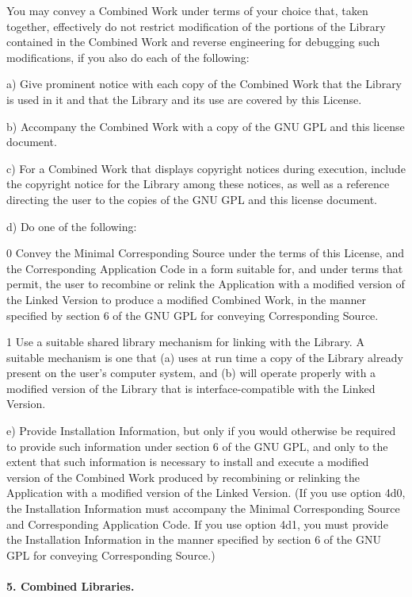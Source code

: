 You may convey a Combined Work under terms of your choice that, taken together, effectively do not restrict modification of the portions of the Library contained in the Combined Work and reverse engineering for debugging such modifications, if you also do each of the following\-:

a) Give prominent notice with each copy of the Combined Work that the Library is used in it and that the Library and its use are covered by this License.

b) Accompany the Combined Work with a copy of the G\-N\-U G\-P\-L and this license document.

c) For a Combined Work that displays copyright notices during execution, include the copyright notice for the Library among these notices, as well as a reference directing the user to the copies of the G\-N\-U G\-P\-L and this license document.

d) Do one of the following\-:

0 Convey the Minimal Corresponding Source under the terms of this License, and the Corresponding Application Code in a form suitable for, and under terms that permit, the user to recombine or relink the Application with a modified version of the Linked Version to produce a modified Combined Work, in the manner specified by section 6 of the G\-N\-U G\-P\-L for conveying Corresponding Source.

1 Use a suitable shared library mechanism for linking with the Library. A suitable mechanism is one that (a) uses at run time a copy of the Library already present on the user's computer system, and (b) will operate properly with a modified version of the Library that is interface-\/compatible with the Linked Version.

e) Provide Installation Information, but only if you would otherwise be required to provide such information under section 6 of the G\-N\-U G\-P\-L, and only to the extent that such information is necessary to install and execute a modified version of the Combined Work produced by recombining or relinking the Application with a modified version of the Linked Version. (If you use option 4d0, the Installation Information must accompany the Minimal Corresponding Source and Corresponding Application Code. If you use option 4d1, you must provide the Installation Information in the manner specified by section 6 of the G\-N\-U G\-P\-L for conveying Corresponding Source.)

\paragraph*{5. Combined Libraries.}

